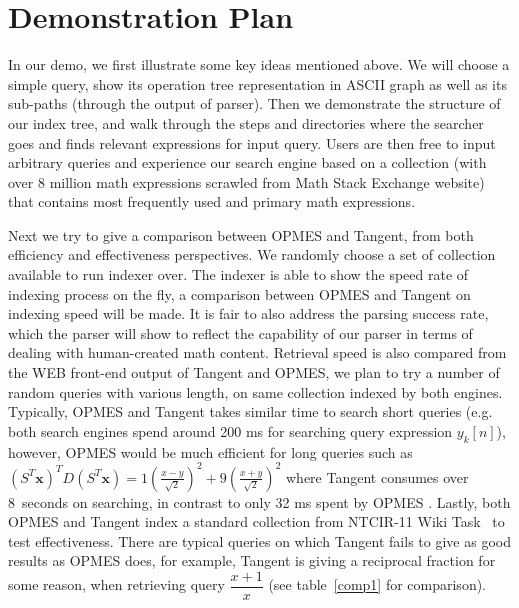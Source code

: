 \documentclass{llncs}
\begin{document}
\section{Demonstration Plan}
In our demo, we first illustrate some key ideas mentioned above.
 We will choose a simple query, show its operation tree representation in ASCII graph as well as its sub-paths (through the output of parser).
 Then we demonstrate the structure of our index tree, and walk through the steps and directories where the searcher goes and finds relevant expressions for input query.
 Users are then free to input arbitrary queries and experience our search engine based on a collection (with over 8 million math expressions scrawled from Math Stack Exchange website) that contains most frequently used and primary math expressions.

Next we try to give a comparison between OPMES and Tangent, from both efficiency and effectiveness perspectives.
We randomly choose a set of collection available to run indexer over.
The indexer is able to show  the speed rate of indexing process on the fly, a comparison between OPMES and Tangent on indexing speed will be made.
It is fair to also address the parsing success rate, which the parser will show to reflect the capability of our parser in terms of dealing with human-created math content.
Retrieval speed is also compared from the WEB front-end output of Tangent and OPMES, we plan to try a number of random queries with various length, on same collection indexed by both engines. 
Typically, OPMES and Tangent takes similar time to search short queries (e.g. both search engines spend around 200 ms for searching query expression $y_{k}[n]$), 
however, OPMES would be much efficient for long queries such as $(S^{T}\mathbf{x})^{T}D(S^{T} \mathbf{x})=1\left(\frac{x-y}{\sqrt{2}}\right)^{2}+9\left(\frac{x+y}{\sqrt{2}} \right)^{2}$ where Tangent consumes over 8~seconds on searching, in contrast to only 32 ms spent by OPMES .
Lastly, both OPMES and Tangent index a standard collection from NTCIR-11 Wiki Task~\cite{ov} to test effectiveness.
There are typical queries on which Tangent fails to give as good results as OPMES does, for example, Tangent is giving a reciprocal fraction for some reason, when retrieving query $\dfrac {x+1}x$ (see table~\ref{comp1} for comparison).
\end{document}
